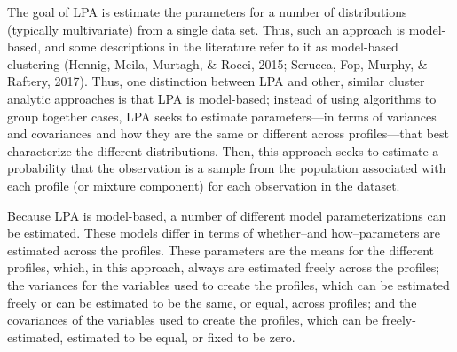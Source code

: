 \documentclass[man]{apa6}
\begin{document}
The goal of LPA is estimate the parameters for a number of distributions
(typically multivariate) from a single data set. Thus, such an approach is
model-based, and some descriptions in the literature refer to it as model-based
clustering (Hennig, Meila, Murtagh, \& Rocci, 2015; Scrucca, Fop, Murphy, \&
Raftery, 2017). Thus, one distinction between LPA and other, similar cluster
analytic approaches is that LPA is model-based; instead of using algorithms to
group together cases, LPA seeks to estimate parameters---in terms of variances
and covariances and how they are the same or different across profiles---that
best characterize the different distributions. Then, this approach seeks to
estimate a probability that the observation is a sample from the population
associated with each profile (or mixture component) for each observation in the
dataset.

Because LPA is model-based, a number of different model parameterizations can be
estimated. These models differ in terms of whether--and how--parameters are
estimated across the profiles. These parameters are the means for the different
profiles, which, in this approach, always are estimated freely across the
profiles; the variances for the variables used to create the profiles, which can
be estimated freely or can be estimated to be the same, or equal, across
profiles; and the covariances of the variables used to create the profiles,
which can be freely-estimated, estimated to be equal, or fixed to be zero.
\end{document}
